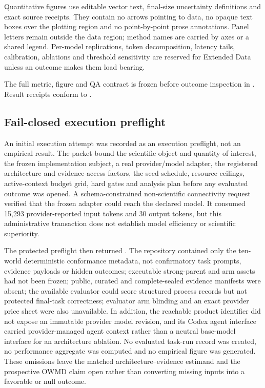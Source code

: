 Quantitative figures use editable vector text, final-size uncertainty definitions and exact source receipts. They contain no arrows pointing to data, no opaque text boxes over the plotting region and no point-by-point prose annotations. Panel letters remain outside the data region; method names are carried by axes or a shared legend. Per-model replications, token decomposition, latency tails, calibration, ablations and threshold sensitivity are reserved for Extended Data unless an outcome makes them load bearing.

The full metric, figure and QA contract is frozen before outcome inspection in . Result receipts conform to .

\subsection{Fail-closed execution preflight}

An initial execution attempt was recorded as an execution preflight, not an empirical result. The packet bound the scientific object and quantity of interest, the frozen implementation subject, a real provider/model adapter, the registered architecture and evidence-access factors, the seed schedule, resource ceilings, active-context budget grid, hard gates and analysis plan before any evaluated outcome was opened. A schema-constrained non-scientific connectivity request verified that the frozen adapter could reach the declared model. It consumed 15,293 provider-reported input tokens and 30 output tokens, but this administrative transaction does not establish model efficiency or scientific superiority.

The protected preflight then returned \CannotCheck{}. The repository contained only the ten-world deterministic conformance metadata, not confirmatory task prompts, evidence payloads or hidden outcomes; executable strong-parent and \RAKL{} arm assets had not been frozen; public, curated and complete-sealed evidence manifests were absent; the available evaluator could score structured process records but not protected final-task correctness; evaluator arm blinding and an exact provider price sheet were also unavailable. In addition, the reachable product identifier did not expose an immutable provider model revision, and its Codex agent interface carried provider-managed agent context rather than a neutral base-model interface for an architecture ablation. No evaluated task-run record was created, no performance aggregate was computed and no empirical figure was generated. These omissions leave the matched architecture--evidence estimand and the prospective OWMD claim open rather than converting missing inputs into a favorable or null outcome.

